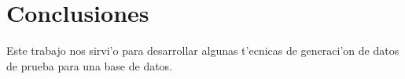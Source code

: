 \chapter{Conclusiones}
Este trabajo nos sirvi'o para desarrollar algunas t'ecnicas de generaci'on de datos de prueba para una base de datos. 